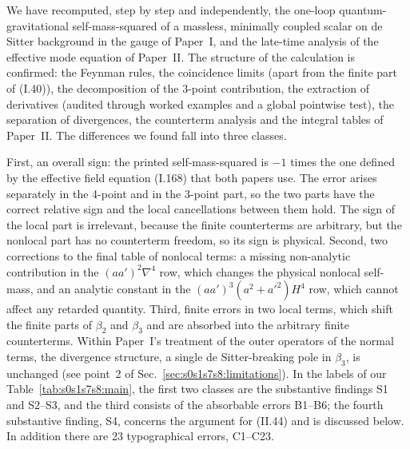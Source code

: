 \documentclass[aps,prd,onecolumn,10pt,nofootinbib,floatfix]{revtex4-2}
\newcommand{\eqI}[1]{(I.#1)}
\newcommand{\eqII}[1]{(II.#1)}
\begin{document}
We have recomputed, step by step and independently, the one-loop quantum-gravitational self-mass-squared of a massless, minimally
coupled scalar on de Sitter background in the gauge of Paper~I, and the late-time analysis of the effective mode equation of Paper~II.
The structure of the calculation is confirmed: the Feynman rules, the coincidence limits (apart from the finite part of \eqI{40}), the
decomposition of the 3-point
contribution, the extraction of derivatives (audited through worked examples and a global pointwise test), the separation of
divergences, the counterterm analysis and the integral tables of
Paper~II\@. The differences we found fall into three classes.

First, an overall sign: the printed self-mass-squared is $-1$ times the one defined by the effective field
equation \eqI{168} that both papers use. The error arises separately in the 4-point and in the 3-point part, so the two parts have the
correct relative sign and the local cancellations between them hold. The sign of the local part is irrelevant, because the finite
counterterms are arbitrary, but the nonlocal part has no counterterm freedom, so its sign is physical. Second, two corrections to the
final table of nonlocal terms: a missing non-analytic contribution in the $(aa')^2\nabla^4$ row, which changes the physical nonlocal
self-mass, and an analytic constant in the $(aa')^3(a^2+a'^2)H^4$ row, which cannot affect any retarded quantity. Third, finite errors
in two local terms, which shift the finite parts of $\beta_2$ and $\beta_3$ and are absorbed into the arbitrary finite counterterms.
Within Paper~I's treatment of the outer operators of the normal terms, the divergence structure, a single de Sitter-breaking pole in
$\beta_3$, is unchanged (see point~2 of Sec.~\ref{sec:s0s1s7s8:limitations}). In the labels of our Table~\ref{tab:s0s1s7s8:main}, the
first two classes are the substantive findings S1 and S2--S3, and the third consists of the absorbable errors B1--B6; the fourth
substantive finding, S4, concerns the argument for \eqII{44} and is discussed below. In addition there are 23 typographical errors, C1--C23.
\end{document}
